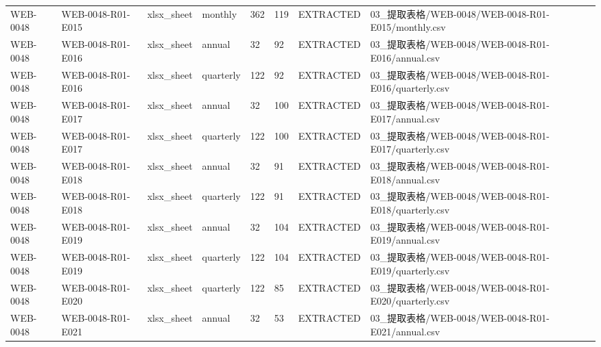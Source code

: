 \begin{landscape}
\begin{longtable}{p{1.8cm}p{2.2cm}p{3.1cm}p{4.7cm}p{1.3cm}p{1.3cm}p{3.0cm}p{5.3cm}}
WEB-0048 & WEB-0048-R01-E015 & xlsx\_\allowbreak{}sheet & monthly & 362 & 119 & EXTRACTED & 03\_\allowbreak{}提取表格/\allowbreak{}WEB-0048/\allowbreak{}WEB-0048-R01-E015/\allowbreak{}monthly.csv\\
WEB-0048 & WEB-0048-R01-E016 & xlsx\_\allowbreak{}sheet & annual & 32 & 92 & EXTRACTED & 03\_\allowbreak{}提取表格/\allowbreak{}WEB-0048/\allowbreak{}WEB-0048-R01-E016/\allowbreak{}annual.csv\\
WEB-0048 & WEB-0048-R01-E016 & xlsx\_\allowbreak{}sheet & quarterly & 122 & 92 & EXTRACTED & 03\_\allowbreak{}提取表格/\allowbreak{}WEB-0048/\allowbreak{}WEB-0048-R01-E016/\allowbreak{}quarterly.csv\\
WEB-0048 & WEB-0048-R01-E017 & xlsx\_\allowbreak{}sheet & annual & 32 & 100 & EXTRACTED & 03\_\allowbreak{}提取表格/\allowbreak{}WEB-0048/\allowbreak{}WEB-0048-R01-E017/\allowbreak{}annual.csv\\
WEB-0048 & WEB-0048-R01-E017 & xlsx\_\allowbreak{}sheet & quarterly & 122 & 100 & EXTRACTED & 03\_\allowbreak{}提取表格/\allowbreak{}WEB-0048/\allowbreak{}WEB-0048-R01-E017/\allowbreak{}quarterly.csv\\
WEB-0048 & WEB-0048-R01-E018 & xlsx\_\allowbreak{}sheet & annual & 32 & 91 & EXTRACTED & 03\_\allowbreak{}提取表格/\allowbreak{}WEB-0048/\allowbreak{}WEB-0048-R01-E018/\allowbreak{}annual.csv\\
WEB-0048 & WEB-0048-R01-E018 & xlsx\_\allowbreak{}sheet & quarterly & 122 & 91 & EXTRACTED & 03\_\allowbreak{}提取表格/\allowbreak{}WEB-0048/\allowbreak{}WEB-0048-R01-E018/\allowbreak{}quarterly.csv\\
WEB-0048 & WEB-0048-R01-E019 & xlsx\_\allowbreak{}sheet & annual & 32 & 104 & EXTRACTED & 03\_\allowbreak{}提取表格/\allowbreak{}WEB-0048/\allowbreak{}WEB-0048-R01-E019/\allowbreak{}annual.csv\\
WEB-0048 & WEB-0048-R01-E019 & xlsx\_\allowbreak{}sheet & quarterly & 122 & 104 & EXTRACTED & 03\_\allowbreak{}提取表格/\allowbreak{}WEB-0048/\allowbreak{}WEB-0048-R01-E019/\allowbreak{}quarterly.csv\\
WEB-0048 & WEB-0048-R01-E020 & xlsx\_\allowbreak{}sheet & quarterly & 122 & 85 & EXTRACTED & 03\_\allowbreak{}提取表格/\allowbreak{}WEB-0048/\allowbreak{}WEB-0048-R01-E020/\allowbreak{}quarterly.csv\\
WEB-0048 & WEB-0048-R01-E021 & xlsx\_\allowbreak{}sheet & annual & 32 & 53 & EXTRACTED & 03\_\allowbreak{}提取表格/\allowbreak{}WEB-0048/\allowbreak{}WEB-0048-R01-E021/\allowbreak{}annual.csv\\

\end{longtable}
\end{landscape}
